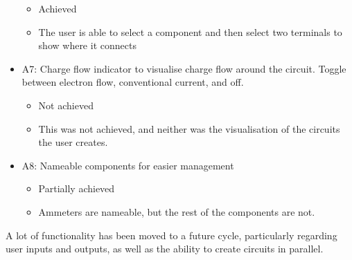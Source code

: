 \begin{itemize}
\begin{itemize}
            \item Achieved
            \item The user is able to select a component and then select two terminals to show where it connects
        \end{itemize}
        \item A7: Charge flow indicator to visualise charge flow around the circuit. Toggle between electron flow, conventional current, and off. 
        \begin{itemize}
            \item Not achieved
            \item This was not achieved, and neither was the visualisation of the circuits the user creates. 
        \end{itemize}
        \item A8: Nameable components for easier management
        \begin{itemize}
            \item Partially achieved
            \item Ammeters are nameable, but the rest of the components are not. 
        \end{itemize}
    \end{itemize}

    A lot of functionality has been moved to a future cycle, particularly regarding user inputs and outputs, as well as the ability to create circuits in parallel. 


